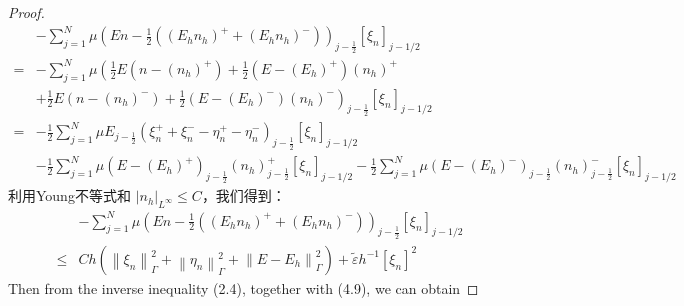 \begin{proof}
    $$
        \begin{aligned}
              & -\sum_{j=1}^{N} \mu\left(E n-\frac{1}{2}\left(\left(E_{h} n_{h}\right)^{+}+\left(E_{h} n_{h}\right)^{-}\right)\right)_{j-\frac{1}{2}}\left[\xi_{n}\right]_{j-1 / 2}                                                                                                                                              \\
            = & -\sum_{j=1}^{N} \mu\left(\frac{1}{2} E\left(n-\left(n_{h}\right)^{+}\right)+\frac{1}{2}\left(E-\left(E_{h}\right)^{+}\right)\left(n_{h}\right)^{+}\right.                                                                                                                                                        \\
              & \left.+\frac{1}{2} E\left(n-\left(n_{h}\right)^{-}\right)+\frac{1}{2}\left(E-\left(E_{h}\right)^{-}\right)\left(n_{h}\right)^{-}\right)_{j-\frac{1}{2}}\left[\xi_{n}\right]_{j-1 / 2}                                                                                                                            \\
            = & -\frac{1}{2} \sum_{j=1}^{N} \mu E_{j-\frac{1}{2}}\left(\xi_{n}^{+}+\xi_{n}^{-}-\eta_{n}^{+}-\eta_{n}^{-}\right)_{j-\frac{1}{2}}\left[\xi_{n}\right]_{j-1 / 2}                                                                                                                                                    \\
              & -\frac{1}{2} \sum_{j=1}^{N} \mu\left(E-\left(E_{h}\right)^{+}\right)_{j-\frac{1}{2}}\left(n_{h}\right)_{j-\frac{1}{2}}^{+}\left[\xi_{n}\right]_{j-1 / 2}-\frac{1}{2} \sum_{j=1}^{N} \mu\left(E-\left(E_{h}\right)^{-}\right)_{j-\frac{1}{2}}\left(n_{h}\right)_{j-\frac{1}{2}}^{-}\left[\xi_{n}\right]_{j-1 / 2}
        \end{aligned}
    $$
    利用Young不等式和 $\left|n_{h}\right|_{L^{\infty}} \leq C$，我们得到： $$
        \begin{aligned}
                 & -\sum_{j=1}^{N} \mu\left(E n-\frac{1}{2}\left(\left(E_{h} n_{h}\right)^{+}+\left(E_{h} n_{h}\right)^{-}\right)\right)_{j-\frac{1}{2}}\left[\xi_{n}\right]_{j-1 / 2}             \\
            \leq & C h\left(\left\|\xi_{n}\right\|_{\Gamma}^{2}+\left\|\eta_{n}\right\|_{\Gamma}^{2}+\left\|E-E_{h}\right\|_{\Gamma}^{2}\right)+\tilde{\varepsilon} h^{-1}\left[\xi_{n}\right]^{2}
        \end{aligned}
    $$
    Then from the inverse inequality (2.4), together with (4.9), we can obtain

\end{proof}
